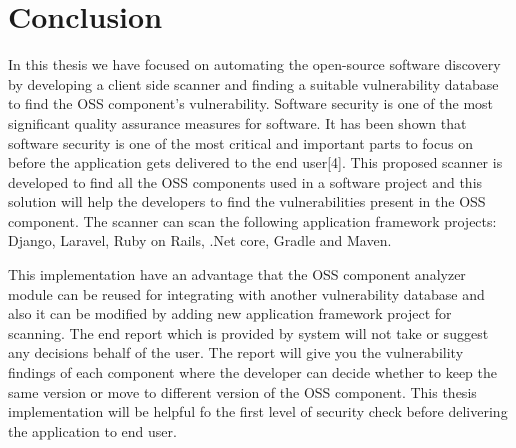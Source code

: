 %
\section{Conclusion}\label{sec:conclusion}
In this thesis we have focused on automating the open-source software discovery by developing a client side scanner and finding a suitable vulnerability database to find the \acs{OSS} component’s vulnerability. Software security is one of the most significant quality assurance measures for software. It has been shown that software security is one of the most critical and important parts to focus on before the application gets delivered to the end user[4]. This proposed scanner is developed to find all the OSS components used in a software project and this solution will help the developers to find the vulnerabilities present in the \acs{OSS} component. The scanner can scan the following application framework projects: Django, Laravel, Ruby on Rails, .Net core, Gradle and Maven.

This implementation have an advantage that the \acs{OSS} component analyzer module can be reused for integrating with another vulnerability database and also it can be modified by adding new application framework project for scanning. The end report which is provided by system will not take or suggest any decisions behalf of the user. The report will give you the vulnerability findings of each component where the developer can decide whether to keep the same version or move to different version of the \acs{OSS} component. This thesis implementation will be helpful fo the first level of security check before delivering the application to end user.
